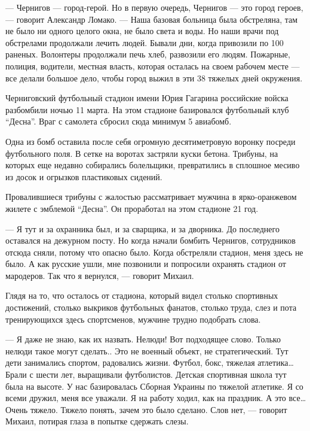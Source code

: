 — Чернигов — город-герой. Но в первую очередь, Чернигов — это город героев, —
говорит Александр Ломако. — Наша базовая больница была обстреляна, там не было
ни одного целого окна, не было света и воды. Но наши врачи под обстрелами
продолжали лечить людей. Бывали дни, когда привозили по 100 раненых. Волонтеры
продолжали печь хлеб, развозили его людям. Пожарные, полиция, водители, местная
власть, которая осталась на своем рабочем месте — все делали большое дело,
чтобы город выжил в эти 38 тяжелых дней окружения. 


Черниговский футбольный стадион имени Юрия Гагарина российские войска
разбомбили ночью 11 марта. На этом стадионе базировался футбольный клуб
\enquote{Десна}. Враг с самолета сбросил сюда минимум 5 авиабомб. 

Одна из бомб оставила после себя огромную десятиметровую воронку посреди
футбольного поля. В сетке на воротах застряли куски бетона. Трибуны, на которых
еще недавно собирались болельщики, превратились в сплошное месиво из досок и
огрызков пластиковых сидений. 

Провалившиеся трибуны с жалостью рассматривает мужчина в ярко-оранжевом жилете
с эмблемой \enquote{Десна}. Он проработал на этом стадионе 21 год. 

— Я тут и за охранника был, и за сварщика, и за дворника. До последнего
оставался на дежурном посту. Но когда начали бомбить Чернигов, сотрудников
отсюда сняли, потому что опасно было. Когда обстреляли стадион, меня здесь не
было. А как русские ушли, мне позвонили и попросили охранять стадион от
мародеров. Так что я вернулся, — говорит Михаил.

Глядя на то, что осталось от стадиона, который видел столько спортивных
достижений, столько выкриков футбольных фанатов, столько труда, слез и пота
тренирующихся здесь спортсменов, мужчине трудно подобрать слова. 

— Я даже не знаю, как их назвать. Нелюди! Вот подходящее слово. Только нелюди
такое могут сделать.. Это не военный объект, не стратегический. Тут дети
занимались спортом, радовались жизни. Футбол, бокс, тяжелая атлетика… Брали с
шести лет, выращивали футболистов. Детская спортивная школа тут была на высоте.
У нас базировалась Сборная Украины по тяжелой атлетике. Я со всеми дружил, меня
все уважали. Я на работу ходил, как на праздник. А это все… Очень тяжело.
Тяжело понять, зачем это было сделано. Слов нет, — говорит Михаил, потирая
глаза в попытке сдержать слезы. 

